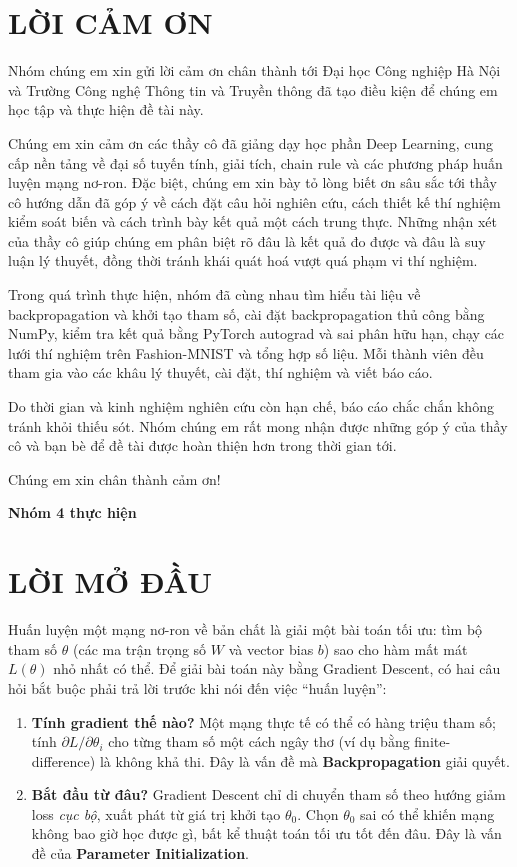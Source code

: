 \documentclass[12pt,a4paper]{report}
\begin{document}

\chapter*{LỜI CẢM ƠN}
\begingroup\selectfont
{}
Nhóm chúng em xin gửi lời cảm ơn chân thành tới Đại học Công nghiệp Hà Nội và Trường Công nghệ Thông tin và Truyền thông đã tạo điều kiện để chúng em học tập và thực hiện đề tài này.

Chúng em xin cảm ơn các thầy cô đã giảng dạy học phần Deep Learning, cung cấp nền tảng về đại số tuyến tính, giải tích, chain rule và các phương pháp huấn luyện mạng nơ-ron. Đặc biệt, chúng em xin bày tỏ lòng biết ơn sâu sắc tới thầy cô hướng dẫn đã góp ý về cách đặt câu hỏi nghiên cứu, cách thiết kế thí nghiệm kiểm soát biến và cách trình bày kết quả một cách trung thực. Những nhận xét của thầy cô giúp chúng em phân biệt rõ đâu là kết quả đo được và đâu là suy luận lý thuyết, đồng thời tránh khái quát hoá vượt quá phạm vi thí nghiệm.

Trong quá trình thực hiện, nhóm đã cùng nhau tìm hiểu tài liệu về backpropagation và khởi tạo tham số, cài đặt backpropagation thủ công bằng NumPy, kiểm tra kết quả bằng PyTorch autograd và sai phân hữu hạn, chạy các lưới thí nghiệm trên Fashion-MNIST và tổng hợp số liệu. Mỗi thành viên đều tham gia vào các khâu lý thuyết, cài đặt, thí nghiệm và viết báo cáo.

Do thời gian và kinh nghiệm nghiên cứu còn hạn chế, báo cáo chắc chắn không tránh khỏi thiếu sót. Nhóm chúng em rất mong nhận được những góp ý của thầy cô và bạn bè để đề tài được hoàn thiện hơn trong thời gian tới.

Chúng em xin chân thành cảm ơn!

\hfill{\textbf{Nhóm 4 thực hiện}}
\endgroup
\clearpage
\chapter*{LỜI MỞ ĐẦU}

Huấn luyện một mạng nơ-ron về bản chất là giải một bài toán tối ưu: tìm bộ
tham số $\theta$ (các ma trận trọng số $W$ và vector bias $b$) sao cho hàm
mất mát $L(\theta)$ nhỏ nhất có thể. Để giải bài toán này bằng Gradient
Descent, có hai câu hỏi bắt buộc phải trả lời trước khi nói đến việc ``huấn
luyện'':

\begin{enumerate}
\item \textbf{Tính gradient thế nào?} Một mạng thực tế có thể có hàng triệu
  tham số; tính $\partial L/\partial\theta_i$ cho từng tham số một cách
  ngây thơ (ví dụ bằng finite-difference) là không khả thi. Đây là vấn đề
  mà \textbf{Backpropagation} giải quyết.
\item \textbf{Bắt đầu từ đâu?} Gradient Descent chỉ di chuyển tham số theo
  hướng giảm loss \emph{cục bộ}, xuất phát từ giá trị khởi tạo $\theta_0$.
  Chọn $\theta_0$ sai có thể khiến mạng không bao giờ học được gì, bất kể
  thuật toán tối ưu tốt đến đâu. Đây là vấn đề của
  \textbf{Parameter Initialization}.
\end{enumerate}
\end{document}
